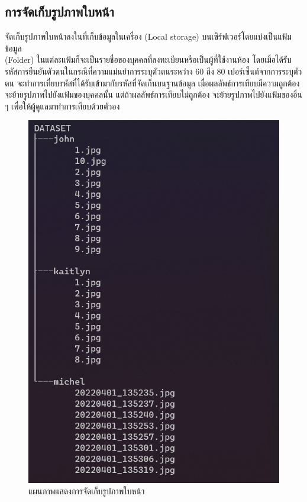 \subsection{การจัดเก็บรูปภาพใบหน้า}
จัดเก็บรูปภาพใบหน้าลงในที่เก็บข้อมูลในเครื่อง (Local storage) บนเซิร์ฟเวอร์โดยแบ่งเป็นแฟ้มข้อมูล \\(Folder) 
ในแต่ละแฟ้มก็จะเป็นรายชื่อของบุคคลที่ลงทะเบียนหรือเป็นผู้ที่ใช้งานห้อง 
โดยเมื่อได้รับรหัสการยืนยันตัวตนในกรณีที่ความแม่นยำการระบุตัวตนระหว่าง 60 ถึง 80 เปอร์เซ็นต์จากการระบุตัวตน จะทำการเที่ยบรหัสที่ได้รับเข้ามากับรหัสที่จัดเก็นบนฐานข้อมูล 
เมื่อผลลัพธ์การเทียบมีความถูกต้องจะย้ายรูปภาพไปยังแฟ้มของบุคคลนั้น แต่ถ้าผลลัพธ์การเทียบไม่ถูกต้อง
จะย้ายรูปภาพไปยังแฟ้มของอื่น ๆ เพื่อให้ผู้ดูแลมาทำการเทียบด้วยตัวอง

\begin{figure}[ht]
  \begin{center}
    \includegraphics[scale=.5]{pic/dataset.png}
  \caption[แผนภาพแสดงการจัดเก็บรูปภาพใบหน้า]{แผนภาพแสดงการจัดเก็บรูปภาพใบหน้า}
  \end{center}
  \label{fig:folder}
\end{figure}

